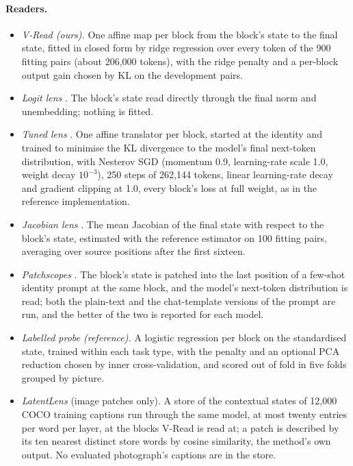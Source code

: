 \paragraph{Readers.}
\begin{itemize}
\item \emph{V-Read (ours).} One affine map per block from the block's state to the final state, fitted in closed form by ridge regression over every token of the 900 fitting pairs (about 206,000 tokens), with the ridge penalty and a per-block output gain chosen by KL on the development pairs.
\item \emph{Logit lens} \citep{nostalgebraist2020logitlens}. The block's state read directly through the final norm and unembedding; nothing is fitted.
\item \emph{Tuned lens} \citep{belrose2025elicitinglatentpredictionstransformers}. One affine translator per block, started at the identity and trained to minimise the KL divergence to the model's final next-token distribution, with Nesterov SGD (momentum 0.9, learning-rate scale 1.0, weight decay $10^{-3}$), 250 steps of 262,144 tokens, linear learning-rate decay and gradient clipping at 1.0, every block's loss at full weight, as in the reference implementation.
\item \emph{Jacobian lens} \citep{gurnee2026jacobianlens}. The mean Jacobian of the final state with respect to the block's state, estimated with the reference estimator on 100 fitting pairs, averaging over source positions after the first sixteen.
\item \emph{Patchscopes} \citep{ghandeharioun2024patchscopes}. The block's state is patched into the last position of a few-shot identity prompt at the same block, and the model's next-token distribution is read; both the plain-text and the chat-template versions of the prompt are run, and the better of the two is reported for each model.
\item \emph{Labelled probe (reference).} A logistic regression per block on the standardised state, trained within each task type, with the penalty and an optional PCA reduction chosen by inner cross-validation, and scored out of fold in five folds grouped by picture.
\item \emph{LatentLens} \citep{kkrojer2026latentlens} (image patches only). A store of the contextual states of 12,000 COCO training captions run through the same model, at most twenty entries per word per layer, at the blocks V-Read is read at; a patch is described by its ten nearest distinct store words by cosine similarity, the method's own output. No evaluated photograph's captions are in the store.
\end{itemize}


